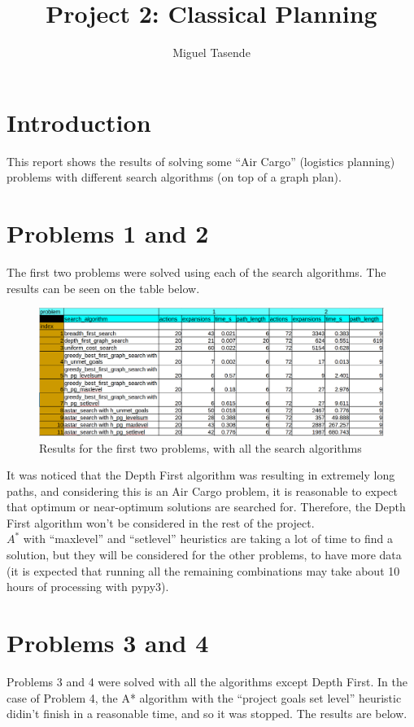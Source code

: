 \documentclass[a4paper,12pt]{article}
\title{\textbf{Project 2: Classical Planning}}
\author{Miguel Tasende}
\begin{document}
\maketitle

\section{Introduction}
This report shows the results of solving some ``Air Cargo'' (logistics planning) problems with different search algorithms (on top of a graph plan).

\section{Problems 1 and 2}
The first two problems were solved using each of the search algorithms. The results can be seen on the table below.

\begin{figure}[!h]
\centering
\includegraphics[width=6.0in]{results/results12.png}
\caption{Results for the first two problems, with all the search algorithms}
\label{fig_raw_data}
\end{figure}

It was noticed that the Depth First algorithm was resulting in extremely long paths, and considering this is an Air Cargo problem, it is reasonable to expect that optimum or near-optimum solutions are searched for. Therefore, the Depth First algorithm won't be considered in the rest of the project.\\
$A^*$ with ``maxlevel'' and ``setlevel'' heuristics are taking a lot of time to find a solution, but they will be considered for the other problems, to have more data (it is expected that running all the remaining combinations may take about 10 hours of processing with pypy3).

\section{Problems 3 and 4}
Problems 3 and 4 were solved with all the algorithms except Depth First. In the case of Problem 4, the A* algorithm with the ``project goals set level'' heuristic didin't finish in a reasonable time, and so it was stopped. The results are below.
\end{document}
